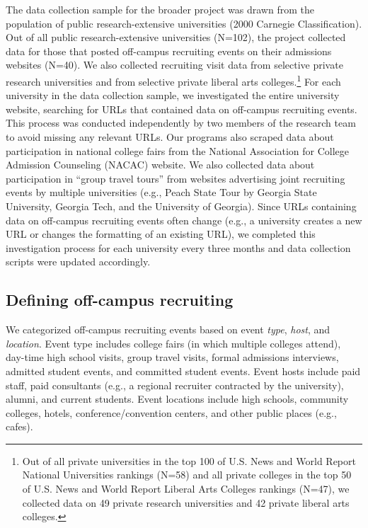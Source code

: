 \documentclass[twoside]{article}
\begin{document}
The data collection sample for the broader project was drawn from the population of public research-extensive universities (2000 Carnegie Classification). Out of all public research-extensive universities (N=102), the project collected data for those that posted off-campus recruiting events on their admissions websites (N=40). We also collected recruiting visit data from selective private research universities and from selective private liberal arts colleges.\footnote{Out of all private universities in the top 100 of U.S. News and World Report National Universities rankings (N=58) and all private colleges in the top 50 of U.S. News and World Report Liberal Arts Colleges rankings (N=47), we collected data on 49 private research universities and 42 private liberal arts colleges.} For each university in the data collection sample, we investigated the entire university website, searching for URLs that contained data on off-campus recruiting events. This process was conducted independently by two members of the research team to avoid missing any relevant URLs. Our programs also scraped data about participation in national college fairs from the National Association for College Admission Counseling (NACAC) website. We also collected data about participation in ``group travel tours'' from websites advertising joint recruiting events by multiple universities (e.g., Peach State Tour by Georgia State University, Georgia Tech, and the University of Georgia). Since URLs containing data on off-campus recruiting events often change (e.g., a university creates a new URL or changes the formatting of an existing URL),  we completed this investigation process for each university every three months and data collection scripts were updated accordingly.

\subsection*{Defining off-campus recruiting}

We categorized off-campus recruiting events based on event \textit{type}, \textit{host}, and \textit{location}. Event type includes college fairs (in which multiple colleges attend), day-time high school visits, group travel visits, formal admissions interviews, admitted student events, and committed student events. Event hosts include paid staff, paid consultants (e.g., a regional recruiter contracted by the university), alumni, and current students. Event locations include high schools, community colleges, hotels, conference/convention centers, and other public places (e.g., cafes).
\end{document}
